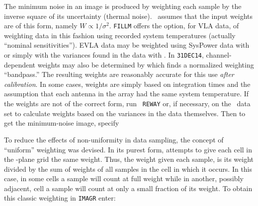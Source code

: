 
     The minimum noise in an image is produced by weighting each
sample by the inverse square of its uncertainty (thermal noise).
\AIPS\ assumes that the input weights are of this form, namely $W
\propto 1/\sigma^2$.  {\tt FILLM} offers the option, for VLA data, of
weighting data in this fashion using recorded system temperatures
(actually ``nominal sensitivities'').  EVLA data may be weighted using
SysPower data with {\tt {}} or simply with the variances
found in the data with {\tt {}}\@.  In {\tt 31DEC14},
channel-dependent weights may also be determined by {\tt {}}
which finds a normalized weighting ``bandpass.''  The resulting weights
are reasonably accurate for this use {\it after calibration}.  In some
cases, weights are simply based on integration times and the
assumption that each antenna in the array had the same system
temperature.  If the weights are not of the correct form, run {\tt
REWAY} or, if necessary,{\tt {}} on the \uv\ data set to
calculate weights based on the variances in the data themselves.  Then
to get the minimum-noise image, specify

     To reduce the effects of non-uniformity in data sampling, the
concept of ``uniform'' weighting was devised.  In its purest form,
 attempts to give each cell in the \uv-plane
grid the same weight.  Thus, the weight given each sample, is its
weight divided by the sum of weights of all samples in the cell in
which it occurs.  In this case, in some cells a sample will count at
full weight while in another, possibly adjacent, cell a sample will
count at only a small fraction of its weight.  To obtain this classic
weighting in {\tt IMAGR} enter:
\pd

